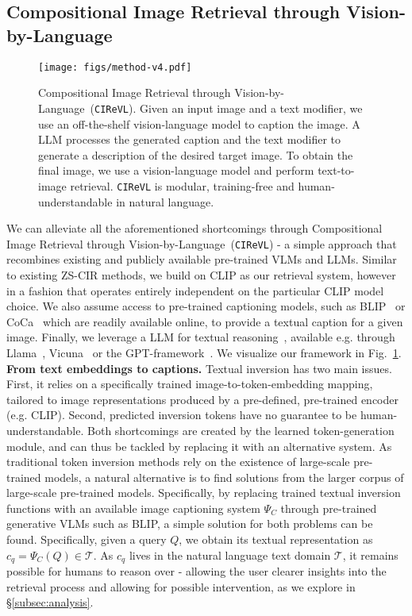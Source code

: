\documentclass{article} \usepackage{iclr2024_conference,times}
\newcommand{\acronym}{{Compositional Image Retrieval through Vision-by-Language}}
\newcommand{\methodName}{\texttt{CIReVL}\xspace} \newcommand{\methodNameNS}{\texttt{CIReVL}}
\begin{document}
\subsection{Compositional Image Retrieval through Vision-by-Language}
\label{subsec:method}
\begin{figure}
    \centering
    \texttt{[image: figs/method-v4.pdf]}
    \caption{
    \acronym\ (\methodNameNS). Given an input image and a text modifier, we use an off-the-shelf vision-language model to caption the image. A LLM processes the generated caption and the text modifier to generate a description of the desired target image. To obtain the final image, we use a vision-language model and perform text-to-image retrieval. \methodName is modular, training-free and human-understandable in natural language.}
    \label{fig:method}
\vspace{-5pt}
\end{figure} We can alleviate all the aforementioned shortcomings through \acronym\ (\methodNameNS) - a simple approach that recombines existing and publicly available pre-trained VLMs and LLMs. 
Similar to existing ZS-CIR methods, we build on CLIP as our retrieval system, however in a fashion that operates entirely independent on the particular CLIP model choice.
We also assume access to pre-trained captioning models, such as BLIP~\citep{blip,blip2} or CoCa~\citep{coca} which are readily available online, to provide a textual caption for a given image. Finally, we leverage a LLM for textual reasoning~\citep{huang2022towards}, available e.g. through Llama~\citep{llama2}, Vicuna~\citep{vicuna2023} or the GPT-framework~\citep{gpt-3}. We visualize our framework in Fig.~\ref{fig:method}.\\

\textbf{From text embeddings to captions.} Textual inversion has two main issues. First, it relies on a specifically trained image-to-token-embedding mapping, tailored to image representations produced by a pre-defined, pre-trained encoder (e.g. CLIP). Second, predicted inversion tokens have no guarantee to be human-understandable.
Both shortcomings are created by the learned token-generation module, and can thus be tackled by replacing it with an alternative system.
As traditional token inversion methods rely on the existence of large-scale pre-trained models, a natural alternative is to find solutions from the larger corpus of large-scale pre-trained models.
Specifically, by replacing trained textual inversion functions with an available image captioning system $\Psi_C$ through pre-trained generative VLMs such as BLIP, a simple solution for both problems can be found.  Specifically, given a query $Q$, we obtain its textual representation as $c_q=\Psi_C(Q)\in\mathcal{T}$. As $c_q$ lives in the natural language text domain $\mathcal{T}$, it remains possible for humans to reason over - allowing the user clearer insights into the retrieval process and allowing for possible intervention, as we explore in \S\ref{subsec:analysis}.
\end{document}
